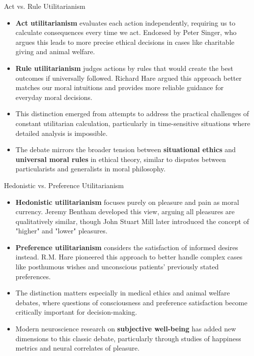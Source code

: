 \documentclass[aspectratio=169]{beamer}
\begin{document}
\begin{frame}{Act vs. Rule Utilitarianism}
    \begin{itemize}
        \item \textbf{Act utilitarianism} evaluates each action independently, requiring us to calculate consequences every time we act. Endorsed by Peter Singer, who argues this leads to more precise ethical decisions in cases like charitable giving and animal welfare.
        
        \item \textbf{Rule utilitarianism} judges actions by rules that would create the best outcomes if universally followed. Richard Hare argued this approach better matches our moral intuitions and provides more reliable guidance for everyday moral decisions.
        
        \item This distinction emerged from attempts to address the practical challenges of constant utilitarian calculation, particularly in time-sensitive situations where detailed analysis is impossible.
        
        \item The debate mirrors the broader tension between \textbf{situational ethics} and \textbf{universal moral rules} in ethical theory, similar to disputes between particularists and generalists in moral philosophy.
    \end{itemize}
 \end{frame}
 
 \begin{frame}{Hedonistic vs. Preference Utilitarianism}
    \begin{itemize}
        \item \textbf{Hedonistic utilitarianism} focuses purely on pleasure and pain as moral currency. Jeremy Bentham developed this view, arguing all pleasures are qualitatively similar, though John Stuart Mill later introduced the concept of "higher" and "lower" pleasures.
        
        \item \textbf{Preference utilitarianism} considers the satisfaction of informed desires instead. R.M. Hare pioneered this approach to better handle complex cases like posthumous wishes and unconscious patients' previously stated preferences.
        
        \item The distinction matters especially in medical ethics and animal welfare debates, where questions of consciousness and preference satisfaction become critically important for decision-making.
        
        \item Modern neuroscience research on \textbf{subjective well-being} has added new dimensions to this classic debate, particularly through studies of happiness metrics and neural correlates of pleasure.
    \end{itemize}
 \end{frame}
 
\end{document}
